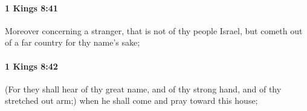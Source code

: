 		\paragraph{1 Kings 8:41} %
			\label{1KINGS-8-41}

			Moreover concerning a stranger, that is not of thy people Israel, but cometh out of a far country for thy name’s sake;


		\paragraph{1 Kings 8:42} %
			\label{1KINGS-8-42}

			(For they shall hear of thy great name, and of thy strong hand, and of thy stretched out arm;) when he shall come and pray toward this house;


